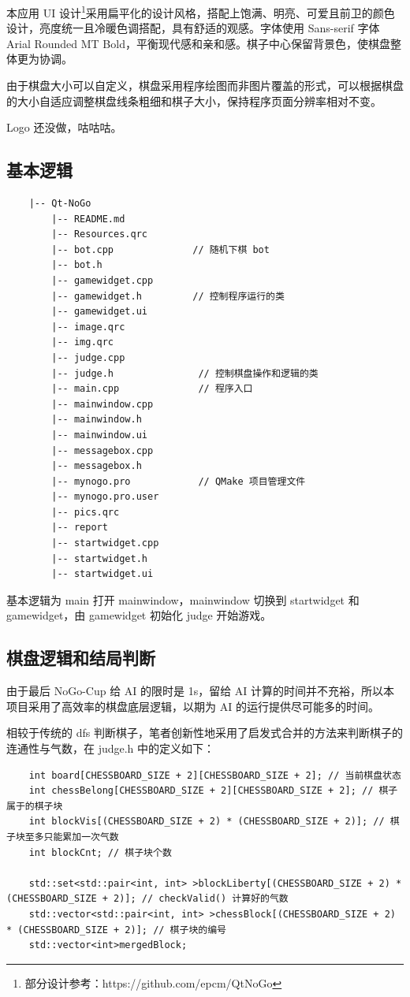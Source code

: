 \documentclass{noithesis}
\begin{document}
	本应用 UI 设计\footnote{部分设计参考：https://github.com/epcm/QtNoGo}采用扁平化的设计风格，搭配上饱满、明亮、可爱且前卫的颜色设计，亮度统一且冷暖色调搭配，具有舒适的观感。字体使用 Sans-serif 字体 Arial Rounded MT Bold，平衡现代感和亲和感。棋子中心保留背景色，使棋盘整体更为协调。
	
	由于棋盘大小可以自定义，棋盘采用程序绘图而非图片覆盖的形式，可以根据棋盘的大小自适应调整棋盘线条粗细和棋子大小，保持程序页面分辨率相对不变。
	
	Logo 还没做，咕咕咕。

	\subsection{基本逻辑}
	
	\begin{verbatim}
	|-- Qt-NoGo
	    |-- README.md
	    |-- Resources.qrc
	    |-- bot.cpp              // 随机下棋 bot
	    |-- bot.h
	    |-- gamewidget.cpp
	    |-- gamewidget.h         // 控制程序运行的类
	    |-- gamewidget.ui
	    |-- image.qrc
	    |-- img.qrc
	    |-- judge.cpp
	    |-- judge.h               // 控制棋盘操作和逻辑的类
	    |-- main.cpp              // 程序入口
	    |-- mainwindow.cpp
	    |-- mainwindow.h
	    |-- mainwindow.ui
	    |-- messagebox.cpp
	    |-- messagebox.h
	    |-- mynogo.pro            // QMake 项目管理文件
	    |-- mynogo.pro.user
	    |-- pics.qrc
	    |-- report
	    |-- startwidget.cpp
	    |-- startwidget.h
	    |-- startwidget.ui
	\end{verbatim}

	基本逻辑为 main 打开 mainwindow，mainwindow 切换到 startwidget 和 gamewidget，由 gamewidget 初始化 judge 开始游戏。

	\subsection{棋盘逻辑和结局判断}
	
	由于最后 NoGo-Cup 给 AI 的限时是 1s，留给 AI 计算的时间并不充裕，所以本项目采用了高效率的棋盘底层逻辑，以期为 AI 的运行提供尽可能多的时间。
	
	相较于传统的 dfs 判断棋子，笔者创新性地采用了启发式合并的方法来判断棋子的连通性与气数，在 judge.h 中的定义如下：
	
	\begin{lstlisting}
	int board[CHESSBOARD_SIZE + 2][CHESSBOARD_SIZE + 2]; // 当前棋盘状态
	int chessBelong[CHESSBOARD_SIZE + 2][CHESSBOARD_SIZE + 2]; // 棋子属于的棋子块
	int blockVis[(CHESSBOARD_SIZE + 2) * (CHESSBOARD_SIZE + 2)]; // 棋子块至多只能累加一次气数
	int blockCnt; // 棋子块个数
	
	std::set<std::pair<int, int> >blockLiberty[(CHESSBOARD_SIZE + 2) * (CHESSBOARD_SIZE + 2)]; // checkValid() 计算好的气数
	std::vector<std::pair<int, int> >chessBlock[(CHESSBOARD_SIZE + 2) * (CHESSBOARD_SIZE + 2)]; // 棋子块的编号
	std::vector<int>mergedBlock;
	\end{lstlisting}
\end{document}
